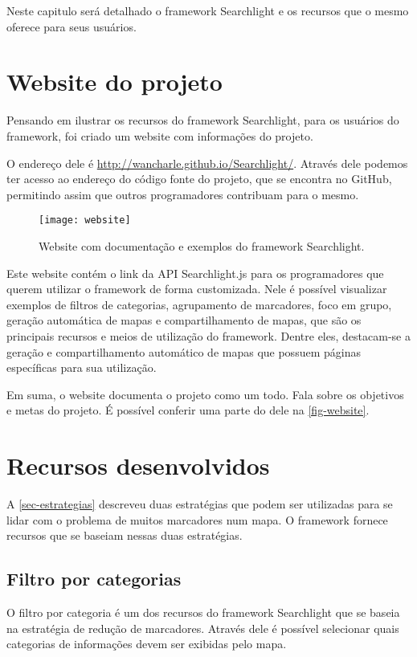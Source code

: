 Neste capitulo será detalhado o framework Searchlight e os recursos que o mesmo oferece para seus usuários.

\section{Website do projeto}
Pensando em ilustrar os recursos do framework Searchlight, para os usuários do framework, foi criado um website com informações do projeto.

O endereço dele é \url{http://wancharle.github.io/Searchlight/}. Através dele podemos ter acesso ao endereço do código fonte do projeto, que se encontra no GitHub, permitindo assim que outros programadores contribuam para o mesmo.

\begin{figure}[htb]
	\caption{\label{fig-website}Website com documentação e exemplos do framework Searchlight.}
	\begin{center}
	    \texttt{[image: website]}
	\end{center}
\end{figure}


Este website contém o link da API Searchlight.js para os programadores que querem utilizar o framework de forma customizada. Nele é possível visualizar exemplos de filtros de categorias, agrupamento de marcadores, foco em grupo, geração automática de mapas e compartilhamento de mapas, que são os principais recursos e meios de utilização do framework. Dentre eles, destacam-se a geração e compartilhamento automático de mapas que possuem páginas específicas para sua utilização. 


Em suma, o website documenta o projeto como um todo. Fala sobre os objetivos e metas do projeto. É possível conferir uma parte do dele na \autoref{fig-website}. 

\section{Recursos desenvolvidos}
A \autoref{sec-estrategias} descreveu duas estratégias que podem ser utilizadas para se lidar com o problema de muitos marcadores num mapa. O framework fornece recursos que se baseiam nessas duas estratégias. 

\subsection{Filtro por categorias}
O filtro por categoria é um dos recursos do framework Searchlight que se baseia na estratégia de redução de marcadores. Através dele é possível selecionar quais categorias de informações devem ser exibidas pelo mapa. 

